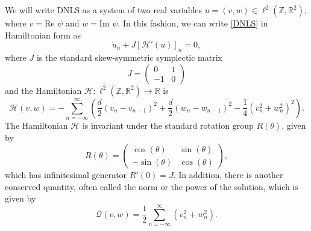 \documentclass[12pt]{elsarticle}
\def\R{{\mathbb R}}
\def\Z{{\mathbb Z}}
\begin{document}
We will write DNLS as a system of two real variables $u = (v, w) \in \ell^2(\Z, \R^2)$, where $v = \text{Re }\psi$ and $w = \text{Im }\psi$. In this fashion, we can write \cref{DNLS} in Hamiltonian form as
\begin{equation}\label{DNLSrealHam}
\dot{u}_n + J [\mathcal{H}'(u)]_n = 0,
\end{equation}
where $J$ is the standard skew-symmetric symplectic matrix
\[
J = \begin{pmatrix}0 & 1 \\ -1 & 0\end{pmatrix}
\]
and the Hamiltonian $\mathcal{H}: \ell^2(\Z,\R^2) \rightarrow \R$ is
\begin{equation}\label{DNLSrealH}
\mathcal{H}(v, w) = -\sum_{n = -\infty}^\infty 
\left( \frac{d}{2}\left(v_n - v_{n-1}\right)^2 + \frac{d}{2}\left(w_n - w_{n-1}\right)^2 - \frac{1}{4}\left( v_n^2 + w_n^2 \right)^2 \right).
\end{equation}
The Hamiltonian $\mathcal{H}$ is invariant under the standard rotation group $R(\theta)$, given by
\begin{equation}\label{Rtheta}
R(\theta) = \begin{pmatrix}
\cos(\theta) & \sin(\theta) \\
-\sin(\theta)& \cos(\theta)
\end{pmatrix},
\end{equation}
which has infinitesimal generator $R'(0) = J$. In addition, there is another conserved quantity, often called the norm or the power of the solution, which is given by
\begin{equation}\label{DNLSQ}
\mathcal{Q}(v, w) = \frac{1}{2} \sum_{n = -\infty}^\infty 
\left( v_n^2 + w_n ^2\right).
\end{equation}
\end{document}
